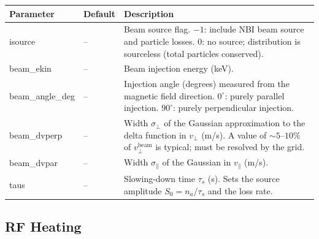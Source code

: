 \documentclass[11pt,a4paper]{article}
\newcommand{\vp}{v_\perp}
\newcommand{\vpa}{v_\parallel}
\begin{document}
\begin{longtable}{>{\ttfamily}p{3.2cm} p{1.5cm} p{9cm}}
\toprule
\normalfont Parameter & Default & Description \\
\midrule
\endhead
\bottomrule
\endlastfoot

isource & -- &
  Beam source flag.
  $-1$: include NBI beam source and particle losses.
  $0$: no source; distribution is sourceless (total particles conserved). \\[4pt]

beam\_ekin & -- &
  Beam injection energy (keV). \\[4pt]

beam\_angle\_deg & -- &
  Injection angle (degrees) measured from the magnetic field direction.
  $0^\circ$: purely parallel injection.
  $90^\circ$: purely perpendicular injection. \\[4pt]

beam\_dvperp & -- &
  Width $\sigma_\perp$ of the Gaussian approximation to the delta function
  in $\vp$ (m/s).  A value of $\sim 5$--$10\%$ of $\vp^\mathrm{beam}$ is
  typical; must be resolved by the grid. \\[4pt]

beam\_dvpar & -- &
  Width $\sigma_\parallel$ of the Gaussian in $\vpa$ (m/s). \\[4pt]

taus & -- &
  Slowing-down time $\tau_s$ (s).  Sets the source amplitude
  $S_0 = n_a / \tau_s$ and the loss rate. \\[4pt]

\end{longtable}

\subsection{RF Heating}
\end{document}
